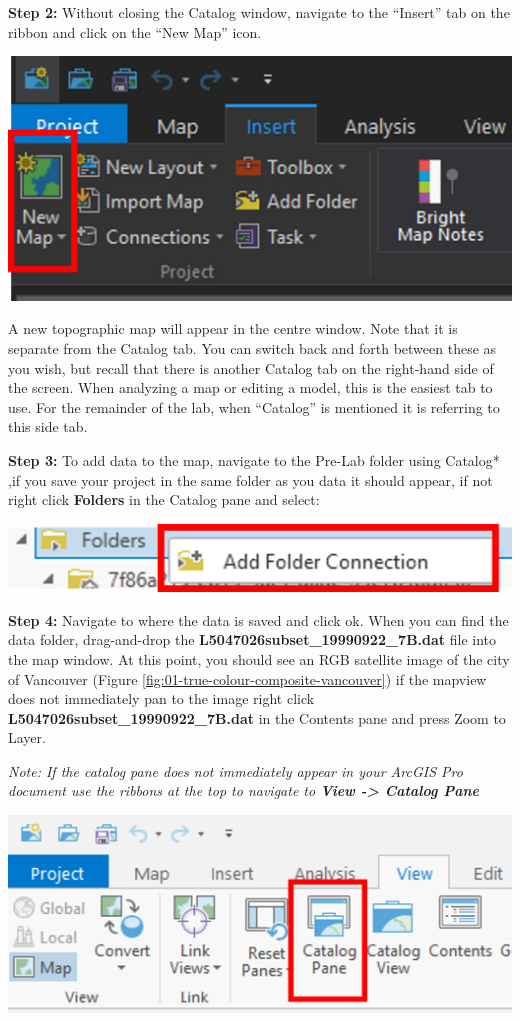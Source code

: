 \documentclass[
]{book}
\begin{document}
\textbf{Step 2:} Without closing the Catalog window, navigate to the ``Insert'' tab on the ribbon and click on the ``New Map'' icon.

\begin{center}\includegraphics[width=0.5\linewidth]{images/01-new-map} \end{center}

A new topographic map will appear in the centre window. Note that it is separate from the Catalog tab. You can switch back and forth between these as you wish, but recall that there is another Catalog tab on the right-hand side of the screen. When analyzing a map or editing a model, this is the easiest tab to use. For the remainder of the lab, when ``Catalog'' is mentioned it is referring to this side tab.

\textbf{Step 3:} To add data to the map, navigate to the Pre-Lab folder using Catalog* ,if you save your project in the same folder as you data it should appear, if not right click \textbf{Folders} in the Catalog pane and select:

\begin{center}\includegraphics[width=0.5\linewidth]{images/01-add-folder-connection} \end{center}

\textbf{Step 4:} Navigate to where the data is saved and click ok. When you can find the data folder, drag-and-drop the \textbf{L5047026subset\_19990922\_7B.dat} file into the map window. At this point, you should see an RGB satellite image of the city of Vancouver (Figure \ref{fig:01-true-colour-composite-vancouver}) if the mapview does not immediately pan to the image right click \textbf{L5047026subset\_19990922\_7B.dat} in the Contents pane and press Zoom to Layer.

\emph{Note: If the catalog pane does not immediately appear in your ArcGIS Pro document use the ribbons at the top to navigate to \textbf{View -\textgreater{} Catalog Pane}}

\begin{center}\includegraphics[width=0.5\linewidth]{images/01-catalog-pane} \end{center}
\end{document}
